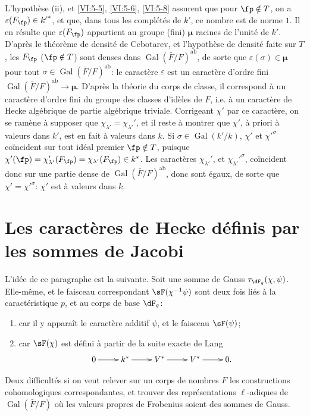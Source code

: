 \documentclass[oneside]{book}
\DeclareMathOperator{\gal}{Gal}
\newcommand{\dmu}{{\bm\mu}}
\theoremstyle{sga-source}
\theoremstyle{sga-source-dash}
\theoremstyle{sga-source-dotdash}
\theoremstyle{sga-source-number-note-dash}
\theoremstyle{sga-source-note-number-dotdash}
\theoremstyle{sga-source-example-dotdash}
\theoremstyle{sga-source-inline-number}
\theoremstyle{sga-source-bare-number}
\theoremstyle{sga-source}
\newcommand{\PrintPage}[1]{}\newcommand{\MathPage}[1]{}\newcommand{\PrintCite}[2]{#1}\newcommand{\var}[3]{#1}
\begin{document}
L'hypothèse (ii), et \ref{VI:5-5}, \ref{VI:5-6}, \ref{VI:5-8} assurent que 
pour $\fp\notin T$, on a $\varepsilon(F_\fp)\in {k'}^\ast$, et que, dans tous 
les complétés de $k'$, ce nombre est de norme $1$. Il en résulte que 
$\varepsilon(F_\fp)$ appartient au \var{groupe (fini) $\dmu$ racines}{groupe (fini) $\dmu$ des racines}{S45-SOL-0884} de l'unité 
de $k'$. D'après le théorème de densité de Cebotarev, et l'hypothèse 
de densité faite sur $T$, les $F_\fp$ ($\fp\notin T$) sont denses dans 
$\gal(\bar F/F)^\text{ab}$, de sorte que $\varepsilon(\sigma)\in \dmu$ pour tout 
$\sigma\in \gal(\bar F/F)^\text{ab}$: le caractère $\varepsilon$ est un 
caractère d'ordre fini $\gal(\bar F/F)^\text{ab}\to \dmu$. D'après la 
théorie du corps de classe, il correspond à un caractère d'ordre fini 
du groupe des classes d'idèles de $F$, i.e. à un caractère de Hecke 
algébrique de partie algébrique triviale. Corrigeant $\chi'$ par ce 
caractère, on se ramène à supposer que 
$\chi_{\lambda'}=\chi_{\lambda'}'$,  et il reste à montrer que $\chi'$, à 
priori à valeurs dans $k'$, est en fait à valeurs dans $k$. Si 
$\sigma\in \gal(k'/k)$, $\chi'$ et ${\chi'}^\sigma$ coïncident sur tout idéal 
premier $\fp\notin T$, puisque 
$\chi'(\fp) = \chi'_{\lambda'}(F_\fp) = \chi_{\lambda'}(F_\fp) \in k^\ast$. 
Les caractères $\chi_{\lambda'}'$, et ${\chi_{\lambda'}'}^\sigma$, coïncident 
donc sur une partie dense de $\gal(\bar F/F)^\text{ab}$, donc sont égaux, de 
sorte que $\chi'={\chi'}^\sigma$: $\chi'$ est à valeurs dans $k$. 










\PrintPage{213}
\section{Les caractères de Hecke définis par les sommes de Jacobi}\label{VI:6}

L'idée de ce paragraphe est la suivante. Soit une somme de Gauss 
$\tau_{\dF_q}(\chi,\psi)$. Elle-même, et le faisceau correspondant 
$\sF(\chi^{-1}\psi)$ sont deux fois liés à la caractéristique $p$, et au 
corps de base $\dF_q$: 
\begin{enumerate}[\indent a)]
  \item car il y appara\^it le caractère additif $\psi$, et le faisceau 
    $\sF(\psi)$; 
  \item car $\sF(\chi)$ est défini à partir de la suite exacte de Lang 
    \[\xymatrix{
      0 \ar[r] 
        & k^\ast \ar[r] 
        & V^\ast \ar[r] 
        & V^\ast \ar[r] 
        & 0 \text{.} 
    }\]
\end{enumerate}
Deux difficultés si on veut relever sur un corps de nombres $F$ les 
constructions cohomologiques correspondantes, et trouver des 
représentations $\ell$-adiques de $\gal(\bar F/F)$ où les valeurs propres 
de Frobenius soient des sommes de Gauss. 
\end{document}
